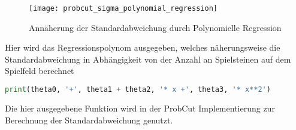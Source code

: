 \begin{figure}[H]
    \centering
    \texttt{[image: probcut\_sigma\_polynomial\_regression]}
    \caption{Annäherung der Standardabweichung durch Polynomielle Regression}
    \label{fig:probcut_sigma_polynomial_regression}
\end{figure}

Hier wird das Regressionspolynom ausgegeben, welches näherungsweise die
Standardabweichung in Abhängigkeit von der Anzahl an Spielsteinen auf
dem Spielfeld berechnet

\begin{lstlisting}[language=Python]
print(theta0, '+', theta1 + theta2, '* x +', theta3, '* x**2')
\end{lstlisting}

Die hier ausgegebene Funktion wird in der ProbCut Implementierung zur
Berechnung der Standardabweichung genutzt.
